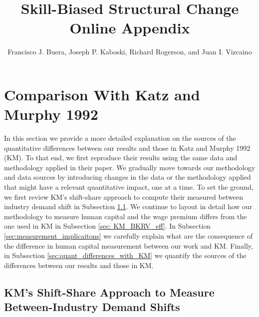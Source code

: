 \documentclass[10pt]{article}
\title{Skill-Biased Structural Change\\ \LARGE \textbf{Online Appendix}}
\date{}
\author{Francisco J. Buera, Joseph P. Kaboski, Richard Rogerson, and Juan I. Vizcaino}
\begin{document}
\maketitle

\section{Comparison With Katz and Murphy 1992}
In this section we provide a more detailed explanation on the sources of the quantitative differences between our results and those in Katz and Murphy 1992 (KM). To that end, we first reproduce their results using the same data and methodology applied in their paper. We gradually move towards our methodology and data sources by introducing changes in the data or the methodology applied that might have a relevant quantitative impact, one at a time. To set the ground, we first review KM's shift-share approach to compute their measured between industry demand shift in Subsection \ref{sec: KM_shift_share}. We continue to layout in detail how our methodology to measure human capital and the wage premium differs from the one used in KM in Subsection \ref{sec: KM_BKRV_eff}. In Subsection \ref{sec:measurement_implicaitons} we carefully explain what are the consequence of the difference in human capital measurement between our work and KM. Finally, in Subsection \ref{sec:quant_differences_with_KM} we quantify the sources of the differences between our results and those in KM. 

\subsection{KM's Shift-Share Approach to Measure Between-Industry Demand Shifts} \label{sec: KM_shift_share}
\begin{comment}
We begin by reviewing KM's approach to measuring demand shifts. Since we are interested in quantifying the change in demand in favor of high-skill labor that is due to the sectoral reallocation of economic activity, we focus on their shift-share methodology to compute the between-sector demand shift in favor of high-skill workers and on the contribution of this between-industry demand shift on the total demand shift in favor of high-skill workers. To ease the comparison, we follow their methodology throughout Table A.\\
\end{comment}
\end{document}
